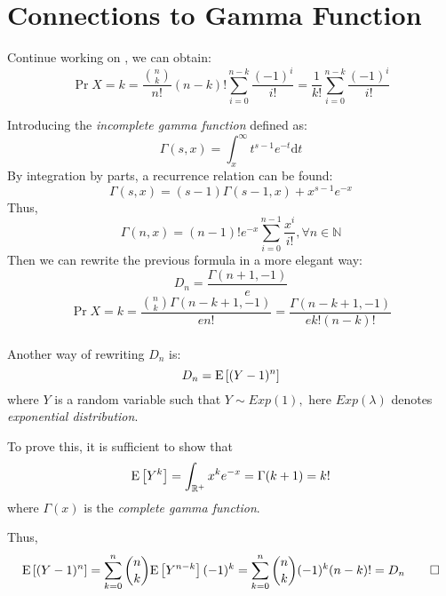 
\section{Connections to Gamma Function}
Continue working on , we can obtain:
 \begin{equation}
 \Pr{X=k} = \dfrac{{n\choose{k}}}{n!}(n-k)!\sum_{i=0}^{n-k}{\dfrac{(-1)^i}{i!}} = \dfrac{1}{k!}\sum_{i=0}^{n-k}\dfrac{(-1)^i}{i!}
 \label{eqn:def-p}
 \end{equation}

Introducing the \emph{incomplete gamma function} defined as:
\[ \Gamma(s,x) = \int_{x}^{\infty}t^{s-1}e^{-t}\mathrm{d}t\]
By integration by parts, a recurrence relation can be found:
\[ \Gamma(s,x) = (s-1)\Gamma(s-1,x) + x^{s-1}e^{-x}\]
Thus,
\[\Gamma(n,x) = (n-1)! e^{-x}\sum_{i=0}^{n-1}\dfrac{x^i}{i!}, \forall n\in \mathbb{N} \]
Then we can rewrite the previous formula in a more elegant way:
\[ D_n = \dfrac{\Gamma(n+1, -1)}{e}\]
\[ \Pr{X=k}=\dfrac{{n\choose{k}}\Gamma(n-k+1,-1)}{en!} =\dfrac{\Gamma(n-k+1,-1)}{ek!(n-k)!}\]
\\

Another way of rewriting $ D_n$ is:
\[ D_n = \text{E}\left[(Y-1)^n\right]\]
where $ Y$ is a random variable such that $ Y\sim Exp(1),$
here  $Exp(\lambda) $ denotes \emph{exponential distribution}.

To prove this, it is sufficient to show that
\[ \E{Y^k} = \int_{\mathbb{R}^+}x^ke^{-x} = \Gamma(k+1) = k!\]
where $ \Gamma(x)$ is the \emph{complete gamma function}.

Thus,
\[ \E{(Y-1)^n} = \sum_{k=0}^n{n\choose{k}}\E{Y^{n-k}}(-1)^k = \sum_{k=0}^n{n\choose k}(-1)^k(n-k)! = D_n \qed\]
